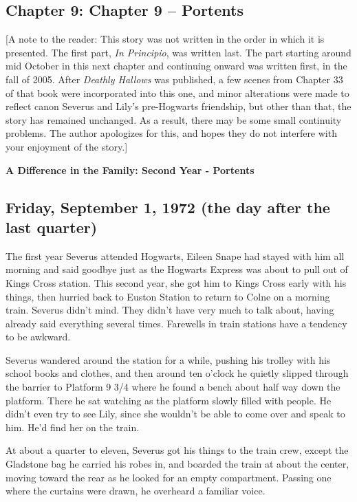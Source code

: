 \documentclass[a4paper,11pt]{article}
\begin{document}
\subsection{Chapter 9: Chapter 9 – Portents}

[A note to the reader: This story was not written in the order in which it is presented. The first part, \emph{In Principio}, was written last. The part starting around mid October in this next chapter and continuing onward was written first, in the fall of 2005. After \emph{Deathly Hallows} was published, a few scenes from Chapter 33 of that book were incorporated into this one, and minor alterations were made to reflect canon Severus and Lily's pre-Hogwarts friendship, but other than that, the story has remained unchanged. As a result, there may be some small continuity problems. The author apologizes for this, and hopes they do not interfere with your enjoyment of the story.]

\textbf{A Difference in the Family: Second Year - Portents}

\subsection{Friday, September 1, 1972 (the day after the last quarter)}

The first year Severus attended Hogwarts, Eileen Snape had stayed with him all morning and said goodbye just as the Hogwarts Express was about to pull out of Kings Cross station. This second year, she got him to Kings Cross early with his things, then hurried back to Euston Station to return to Colne on a morning train. Severus didn't mind. They didn't have very much to talk about, having already said everything several times. Farewells in train stations have a tendency to be awkward.

Severus wandered around the station for a while, pushing his trolley with his school books and clothes, and then around ten o'clock he quietly slipped through the barrier to Platform 9 3/4 where he found a bench about half way down the platform. There he sat watching as the platform slowly filled with people. He didn't even try to see Lily, since she wouldn't be able to come over and speak to him. He'd find her on the train.

At about a quarter to eleven, Severus got his things to the train crew, except the Gladstone bag he carried his robes in, and boarded the train at about the center, moving toward the rear as he looked for an empty compartment. Passing one where the curtains were drawn, he overheard a familiar voice.
\end{document}
